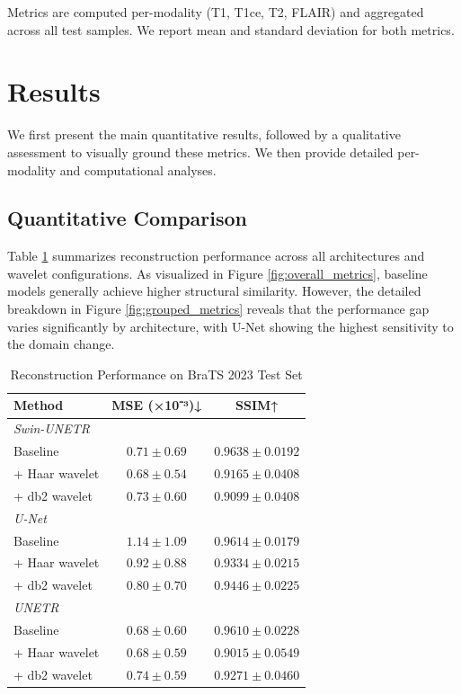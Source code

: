 \documentclass[conference]{IEEEtran}
\begin{document}
Metrics are computed per-modality (T1, T1ce, T2, FLAIR) and aggregated across all test samples. We report mean and standard deviation for both metrics.

\section{Results}

We first present the main quantitative results, followed by a qualitative assessment to visually ground these metrics. We then provide detailed per-modality and computational analyses.

\subsection{Quantitative Comparison}

Table \ref{tab:main_results} summarizes reconstruction performance across all architectures and wavelet configurations. As visualized in Figure \ref{fig:overall_metrics}, baseline models generally achieve higher structural similarity. However, the detailed breakdown in Figure \ref{fig:grouped_metrics} reveals that the performance gap varies significantly by architecture, with U-Net showing the highest sensitivity to the domain change.

\begin{table}[!t]
\caption{Reconstruction Performance on BraTS 2023 Test Set}
\label{tab:main_results}
\centering
\small
\begin{tabular}{@{}lcc@{}}
\toprule
\textbf{Method} & \textbf{MSE (×10⁻³)↓} & \textbf{SSIM↑} \\
\midrule
\multicolumn{3}{l}{\textit{Swin-UNETR}} \\
\quad Baseline & $\mathbf{0.71 \pm 0.69}$ & $\mathbf{0.9638 \pm 0.0192}$ \\
\quad + Haar wavelet & $0.68 \pm 0.54$ & $0.9165 \pm 0.0408$ \\
\quad + db2 wavelet & $0.73 \pm 0.60$ & $0.9099 \pm 0.0408$ \\
\midrule
\multicolumn{3}{l}{\textit{U-Net}} \\
\quad Baseline & $1.14 \pm 1.09$ & $0.9614 \pm 0.0179$ \\
\quad + Haar wavelet & $0.92 \pm 0.88$ & $0.9334 \pm 0.0215$ \\
\quad + db2 wavelet & $0.80 \pm 0.70$ & $0.9446 \pm 0.0225$ \\
\midrule
\multicolumn{3}{l}{\textit{UNETR}} \\
\quad Baseline & $\mathbf{0.68 \pm 0.60}$ & $0.9610 \pm 0.0228$ \\
\quad + Haar wavelet & $0.68 \pm 0.59$ & $0.9015 \pm 0.0549$ \\
\quad + db2 wavelet & $0.74 \pm 0.59$ & $0.9271 \pm 0.0460$ \\
\bottomrule
\end{tabular}
\end{table}
\end{document}
